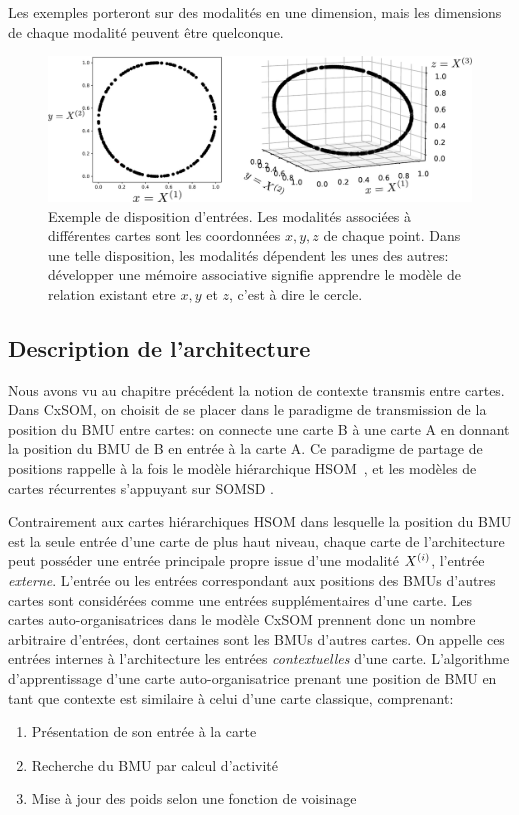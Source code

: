 Les exemples porteront sur des modalités en une dimension, mais les dimensions de chaque modalité peuvent être quelconque.
\begin{figure}
\centering
\includegraphics[width=\textwidth]{inputs_3som}
\caption{Exemple de disposition d'entrées. Les modalités associées à différentes cartes sont les coordonnées $x,y,z$ de chaque point. Dans une telle disposition, les modalités dépendent les unes des autres: développer une mémoire associative signifie apprendre le modèle de relation existant etre $x,y$ et $z$, c'est à dire le cercle.}
\label{fig:inputs}
\end{figure}

\subsection{Description de l'architecture}

Nous avons vu au chapitre précédent la notion de contexte transmis entre cartes. Dans CxSOM, on choisit de se placer dans le paradigme de transmission de la position du BMU entre cartes: on connecte une carte B à une carte A en donnant la position du BMU de B en entrée à la carte A. 
Ce paradigme de partage de positions rappelle à la fois le modèle hiérarchique HSOM~\cite{lampinen_clustering_1992}, et les modèles de cartes récurrentes s'appuyant sur SOMSD \cite{hammer_recursive_2004,hagenbuchner_self-organizing_2003,fix20}.


Contrairement aux cartes hiérarchiques HSOM dans lesquelle la position du BMU est la seule entrée d'une carte de plus haut niveau, chaque carte de l'architecture peut posséder une entrée principale propre issue d'une modalité $X^{({i})}$, l'entrée \emph{externe}. L'entrée ou les entrées correspondant aux positions des BMUs d'autres cartes sont considérées comme une entrées supplémentaires d'une carte. Les cartes auto-organisatrices dans le modèle CxSOM prennent donc un nombre arbitraire d'entrées, dont certaines sont les BMUs d'autres cartes. On appelle ces entrées internes à l'architecture les entrées \emph{contextuelles} d'une carte.
L'algorithme d'apprentissage d'une carte auto-organisatrice prenant une position de BMU en tant que contexte est similaire à celui d'une carte classique, comprenant:
\begin{enumerate}
\item\label{etape:entree} Présentation de son entrée à la carte 
\item\label{etape:bmu} Recherche du BMU par calcul d'activité
\item\label{etape:maj} Mise à jour des poids selon une fonction de voisinage
\end{enumerate}

